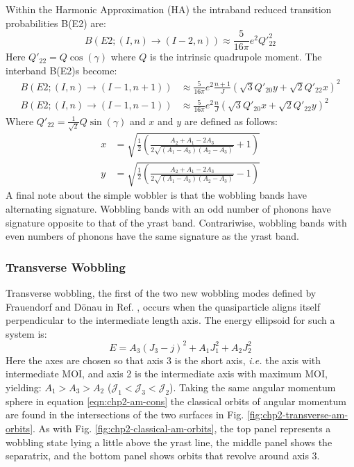 Within the Harmonic Approximation (HA) the intraband reduced transition probabilities B(E2) \cite{wobblingGeometry} are:
\begin{equation}
\label{eqn:chp2-simple-wobb-intraband-e2-red-mat}
B(E2;(I,n)\rightarrow(I-2,n))\approx\frac{5}{16\pi}e^2Q'^2_{22}
\end{equation}
Here $Q'_{22}=Q\cos(\gamma)$ where $Q$ is the intrinsic quadrupole moment. The interband B(E2)s \cite{wobblingGeometry} become:
\begin{align}
\label{eqn:chp2-simple-wobb-interband-e2-red-mat}
B(E2;(I,n)\rightarrow(I-1,n+1))&\approx\frac{5}{16\pi}e^2\frac{n+1}{J}\left(\sqrt{3}Q'_{20}y+\sqrt{2}Q'_{22}x\right)^2\\
B(E2;(I,n)\rightarrow(I-1,n-1))&\approx\frac{5}{16\pi}e^2\frac{n}{J}\left(\sqrt{3}Q'_{20}x+\sqrt{2}Q'_{22}y\right)^2
\end{align}
Where $Q'_{22}=\frac{1}{\sqrt{2}}Q\sin(\gamma)$ and $x$ and $y$ are defined as follows:
\begin{align}
\label{eqn:chp2-simple-wobb-x-y-params}
x&=\sqrt{\frac{1}{2}\left(\frac{A_2+A_1-2A_3}{2\sqrt{(A_1-A_3)(A_2-A_3)}}+1\right)}\\
y&=\sqrt{\frac{1}{2}\left(\frac{A_2+A_1-2A_3}{2\sqrt{(A_1-A_3)(A_2-A_3)}}-1\right)}\nonumber
\end{align}
A final note about the simple wobbler is that the wobbling bands have alternating signature. Wobbling bands with an odd number of phonons have signature opposite to that of the yrast band. Contrariwise, wobbling bands with even numbers of phonons have the same signature as the yrast band.

\subsubsection{Transverse Wobbling}
\label{sssec:models-wobbling-transverse-wobbling}
Transverse wobbling, the first of the two new wobbling modes defined by Frauendorf and D\"onau in Ref. \cite{frauendorfTransverseWobbling}, occurs when the quasiparticle aligns itself perpendicular to the intermediate length axis. The energy ellipsoid for such a system is:
\begin{equation}
\label{eqn:chp2-transverse-en-ellipsoid}
E=A_3(J_3-j)^2 + A_1J_1^2 + A_2J_2^2
\end{equation}
Here the axes are chosen so that axis 3 is the short axis, \emph{i.e.} the axis with intermediate MOI, and axis 2 is the intermediate axis with maximum MOI, yielding: $A_1>A_3>A_2$ ($\mathcal{J}_1<\mathcal{J}_3<\mathcal{J}_2$). Taking the same angular momentum sphere in equation \ref{eqn:chp2-am-cons} the classical orbits of angular momentum are found in the intersections of the two surfaces in Fig. \ref{fig:chp2-transverse-am-orbits}. As with Fig. \ref{fig:chp2-classical-am-orbits}, the top panel represents a wobbling state lying a little above the yrast line, the middle panel shows the separatrix, and the bottom panel shows orbits that revolve around axis 3.

